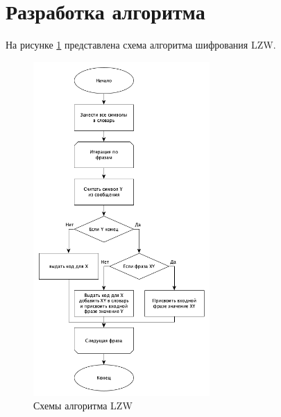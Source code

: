 \section{Разработка алгоритма}

На рисунке \ref{fig:algo} представлена схема алгоритма шифрования LZW.

\begin{figure}[h!]
	\centering
	\includegraphics[width=0.6\textwidth]{img/lzf.png}
	\caption{Схемы алгоритма LZW}
	\label{fig:algo}
\end{figure}

